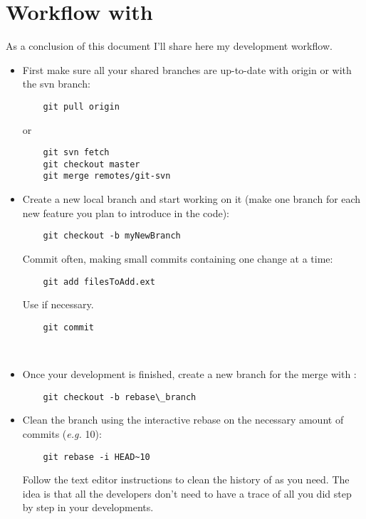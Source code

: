 \chapter{Workflow with }

As a conclusion of this document I'll share here my development workflow.

\begin{itemize}

\item First make sure all your shared branches are up-to-date with origin or with the svn branch:
  \begin{lstlisting}
    git pull origin
  \end{lstlisting}
or
  \begin{lstlisting}
    git svn fetch
    git checkout master
    git merge remotes/git-svn
  \end{lstlisting}
\item Create a new local branch and start working on it (make one branch for each new feature you plan to introduce in the code):
  \begin{lstlisting}
    git checkout -b myNewBranch
  \end{lstlisting}
  Commit often, making small commits containing one change at a time:
  \begin{lstlisting}
    git add filesToAdd.ext
  \end{lstlisting}
  Use  if necessary.
  \begin{lstlisting}
    git commit
  \end{lstlisting}
  \\
\item Once your development is finished, create a new branch for the merge with :
  \begin{lstlisting}
    git checkout -b rebase\_branch
  \end{lstlisting}
\item Clean the branch  using the interactive rebase on the necessary amount of commits (\textit{e.g.} 10):
  \begin{lstlisting}
    git rebase -i HEAD~10
  \end{lstlisting}
  Follow the text editor instructions to clean the history of  as you need.
  The idea is that all the developers don't need to have a trace of all you did step by step in your developments.

\end{itemize}
